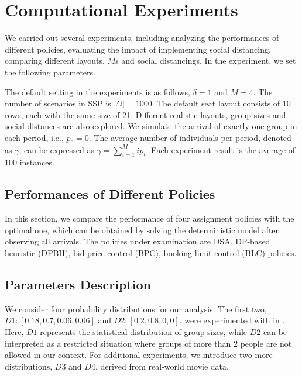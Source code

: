 \section{Computational Experiments}\label{sec_result}
We carried out several experiments, including analyzing the performances of different policies, evaluating the impact of implementing social distancing, comparing different layouts, $M$s and social distancings. In the experiment, we set the following parameters. 

The default setting in the experiments is as follows, $\delta =1$ and $M =4$. The number of scenarios in SSP is $|\Omega| = 1000$. The default seat layout consists of 10 rows, each with the same size of 21. Different realistic layouts, group sizes and social distances are also explored. We simulate the arrival of exactly one group in each period, i.e., $p_0 = 0$. The average number of individuals per period, denoted as $\gamma$, can be expressed as $\gamma = \sum_{i=1}^{M} i p_i$. Each experiment result is the average of 100 instances.

\subsection{Performances of Different Policies}
In this section, we compare the performance of four assignment policies with the optimal one, which can be obtained by solving the deterministic model after observing all arrivals. The policies under examination are DSA, DP-based heuristic (DPBH), bid-price control (BPC), booking-limit control (BLC) policies.

\subsection*{Parameters Description}
We consider four probability distributions for our analysis. The first two, $D1:[0.18,0.7,0.06,0.06]$ and $D2:[0.2,0.8,0,0]$, were experimented with in \cite{blom2022filling}. Here, $D1$ represents the statistical distribution of group sizes, while $D2$ can be interpreted as a restricted situation where groups of more than 2 people are not allowed in our context. For additional experiments, we introduce two more distributions, $D3$ and $D4$, derived from real-world movie data.

